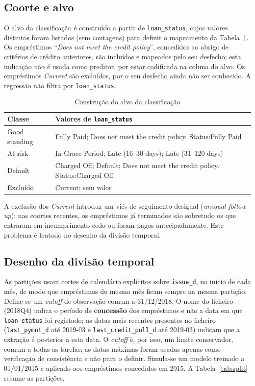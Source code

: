 \subsection{Coorte e alvo}

O alvo da classificação é construído a partir de \texttt{loan\_status}, cujos valores distintos foram listados (sem contagens) para definir o mapeamento da Tabela~\ref{tab:alvo}. Os empréstimos ``\textit{Does not meet the credit policy}'', concedidos ao abrigo de critérios de crédito anteriores, são incluídos e mapeados pelo seu desfecho; esta indicação não é usada como preditor, por estar codificada na coluna do alvo. Os empréstimos \textit{Current} são excluídos, por o seu desfecho ainda não ser conhecido. A regressão não filtra por \texttt{loan\_status}.

\begin{table}[!t]
\caption{Construção do alvo da classificação}
\label{tab:alvo}
\centering
\footnotesize
\begin{tabular}{|p{}|p{}|}
\hline
\textbf{Classe} & \textbf{Valores de \texttt{loan\_status}} \\
\hline
Good standing & Fully Paid; Does not meet the credit policy. Status:Fully Paid \\
\hline
At risk & In Grace Period; Late (16--30 days); Late (31--120 days) \\
\hline
Default & Charged Off; Default; Does not meet the credit policy. Status:Charged Off \\
\hline
Excluído & Current; sem valor \\
\hline
\end{tabular}
\end{table}

A exclusão dos \textit{Current} introduz um viés de seguimento desigual (\textit{unequal follow-up}): nas coortes recentes, os empréstimos já terminados são sobretudo os que entraram em incumprimento cedo ou foram pagos antecipadamente. Este problema é tratado no desenho da divisão temporal.


\subsection{Desenho da divisão temporal}
\label{sec:split}

As partições usam cortes de calendário explícitos sobre \texttt{issue\_d}, no início de cada mês, de modo que empréstimos do mesmo mês ficam sempre na mesma partição. Define-se um \textit{cutoff} de observação comum a 31/12/2018. O nome do ficheiro (2018Q4) indica o período de \textbf{concessão} dos empréstimos e não a data em que \texttt{loan\_status} foi registado; as datas mais recentes presentes no ficheiro (\texttt{last\_pymnt\_d} até 2019-03 e \texttt{last\_credit\_pull\_d} até 2019-03) indicam que a extração é posterior a esta data. O \textit{cutoff} é, por isso, um limite conservador, comum a todas as tarefas; as datas máximas foram usadas apenas como verificação de consistência e não para o definir. Simula-se um modelo treinado a 01/01/2015 e aplicado aos empréstimos concedidos em 2015. A Tabela~\ref{tab:split} resume as partições.

